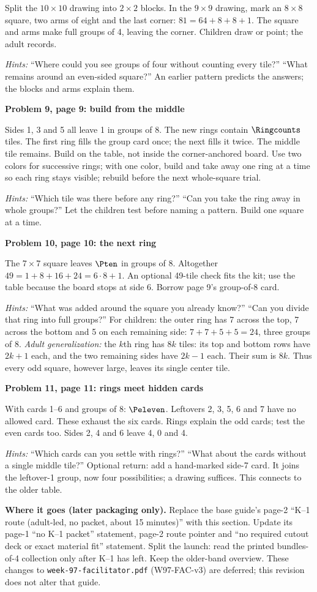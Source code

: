 \documentclass[11pt]{article}
\newcommand{\sub}[1]{\par\textbf{#1}\par}
\begin{document}
Split the $10\times10$ drawing into $2\times2$ blocks. In the $9\times9$ drawing, mark an $8\times8$ square, two arms of eight and the last corner: $81=64+8+8+1$. The square and arms make full groups of 4, leaving the corner. Children draw or point; the adult records.

\textit{Hints:} ``Where could you see groups of four without counting every tile?'' ``What remains around an even-sided square?'' An earlier pattern predicts the answers; the blocks and arms explain them.

\sub{Problem 9, page 9: build from the middle}
Sides 1, 3 and 5 all leave 1 in groups of 8. The new rings contain $\Ringcounts$ tiles. The first ring fills the group card once; the next fills it twice. The middle tile remains. Build on the table, not inside the corner-anchored board. Use two colors for successive rings; with one color, build and take away one ring at a time so each ring stays visible; rebuild before the next whole-square trial.

\textit{Hints:} ``Which tile was there before any ring?'' ``Can you take the ring away in whole groups?'' Let the children test before naming a pattern. Build one square at a time.

\sub{Problem 10, page 10: the next ring}
The $7\times7$ square leaves $\Pten$ in groups of 8. Altogether $49=1+8+16+24=6\cdot8+1$. An optional 49-tile check fits the kit; use the table because the board stops at side 6. Borrow page 9's group-of-8 card.

\textit{Hints:} ``What was added around the square you already know?'' ``Can you divide that ring into full groups?'' For children: the outer ring has 7 across the top, 7 across the bottom and 5 on each remaining side: $7+7+5+5=24$, three groups of 8. \emph{Adult generalization:} the $k$th ring has $8k$ tiles: its top and bottom rows have $2k+1$ each, and the two remaining sides have $2k-1$ each. Their sum is $8k$. Thus every odd square, however large, leaves its single center tile.

\sub{Problem 11, page 11: rings meet hidden cards}
With cards 1--6 and groups of 8: $\Peleven$. Leftovers 2, 3, 5, 6 and 7 have no allowed card. These exhaust the six cards. Rings explain the odd cards; test the even cards too. Sides 2, 4 and 6 leave 4, 0 and 4.

\textit{Hints:} ``Which cards can you settle with rings?'' ``What about the cards without a single middle tile?'' Optional return: add a hand-marked side-7 card. It joins the leftover-1 group, now four possibilities; a drawing suffices. This connects to the older table.

\textbf{Where it goes (later packaging only).} Replace the base guide's page-2 ``K--1 route (adult-led, no packet, about 15 minutes)'' with this section. Update its page-1 ``no K--1 packet'' statement, page-2 route pointer and ``no required cutout deck or exact material fit'' statement. Split the launch: read the printed bundles-of-4 collection only after K--1 has left. Keep the older-band overview. These changes to \texttt{week-97-facilitator.pdf} (W97-FAC-v3) are deferred; this revision does not alter that guide.
\end{document}
